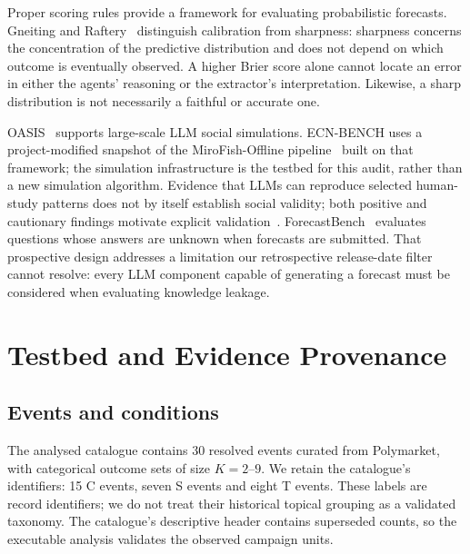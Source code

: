 \documentclass[10pt,conference]{IEEEtran}
\begin{document}
Proper scoring rules provide a framework for evaluating probabilistic forecasts.
Gneiting and Raftery~\cite{gneiting2007} distinguish calibration from sharpness:
sharpness concerns the concentration of the predictive distribution and does not
depend on which outcome is eventually observed. A higher Brier score alone cannot
locate an error in either the agents' reasoning or the extractor's interpretation.
Likewise, a sharp distribution is not necessarily a faithful or accurate one.

OASIS~\cite{yang2024,oasissoftware} supports large-scale LLM social simulations.
ECN-BENCH uses a project-modified snapshot of the MiroFish-Offline
pipeline~\cite{mirofishoffline} built on that framework; the simulation
infrastructure is the testbed for this audit, rather than a new simulation
algorithm. Evidence that LLMs can reproduce selected human-study patterns does
not by itself establish social validity; both positive and cautionary findings
motivate explicit validation~\cite{aher2023simulate,zhou2024socialsimulation}.
ForecastBench~\cite{karger2024} evaluates questions whose answers are unknown when
forecasts are submitted. That prospective design addresses a limitation our
retrospective release-date filter cannot resolve: every LLM component capable
of generating a forecast must be considered when evaluating knowledge leakage.

\section{Testbed and Evidence Provenance}
\label{sec:design}
\subsection{Events and conditions}
The analysed catalogue contains 30 resolved events curated from Polymarket,
with categorical outcome sets of size $K=2$--$9$. We retain the catalogue's
identifiers: 15 C events, seven S events and eight T events. These labels are
record identifiers; we do not treat their historical topical grouping as a
validated taxonomy. The catalogue's descriptive header contains superseded
counts, so the executable analysis validates the observed campaign units.
\end{document}
